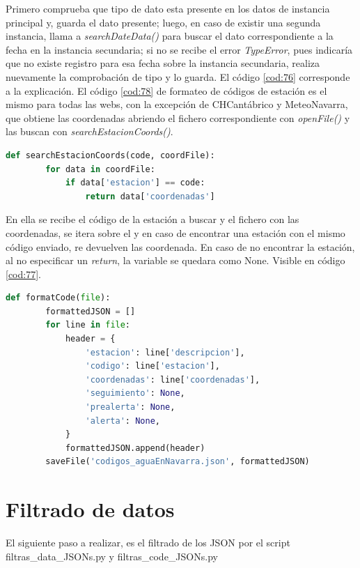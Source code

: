 Primero comprueba que tipo de dato esta presente en los datos de instancia principal y, guarda el dato presente; luego, en caso de existir una segunda instancia, llama a \textit{searchDateData()} para buscar el dato correspondiente a la fecha en la instancia secundaria; si no se recibe el error \textit{TypeError}, pues indicaría que no existe registro para esa fecha sobre la instancia secundaria, realiza nuevamente la comprobación de tipo y lo guarda. El código \ref{cod:76} corresponde a la explicación.\newline
\newline
El código \ref{cod:78} de formateo de códigos de estación es el mismo para todas las webs, con la excepción de CHCantábrico y MeteoNavarra, que obtiene las coordenadas abriendo el fichero correspondiente con \textit{openFile()} y las buscan con \textit{searchEstacionCoords()}.

\begin{lstlisting}[language=Python, caption={Declaración función \textit{searchEstacionCoords()}} usada para formatear los JSON de códigos en CHCantábrico y MeteoNavarra, label=cod:77]
	def searchEstacionCoords(code, coordFile):
		for data in coordFile:
			if data['estacion'] == code:
				return data['coordenadas']
\end{lstlisting}

En ella se recibe el código de la estación a buscar y el fichero con las coordenadas, se itera sobre el y en caso de encontrar una estación con el mismo código enviado, re devuelven las coordenada. En caso de no encontrar la estación, al no especificar un \textit{return}, la variable se quedara como None. Visible en código \ref{cod:77}.

\begin{lstlisting}[language=Python, caption={Declaración función \textit{formatCode()}}, label=cod:78]
	def formatCode(file):
		formattedJSON = []
		for line in file:
			header = {
				'estacion': line['descripcion'],
				'codigo': line['estacion'],
				'coordenadas': line['coordenadas'],
				'seguimiento': None,
				'prealerta': None,
				'alerta': None,	
			}
			formattedJSON.append(header)
		saveFile('codigos_aguaEnNavarra.json', formattedJSON)
\end{lstlisting}

\section{Filtrado de datos}
El siguiente paso a realizar, es el filtrado de los JSON por el script filtras\_data\_JSONs.py y filtras\_code\_JSONs.py


